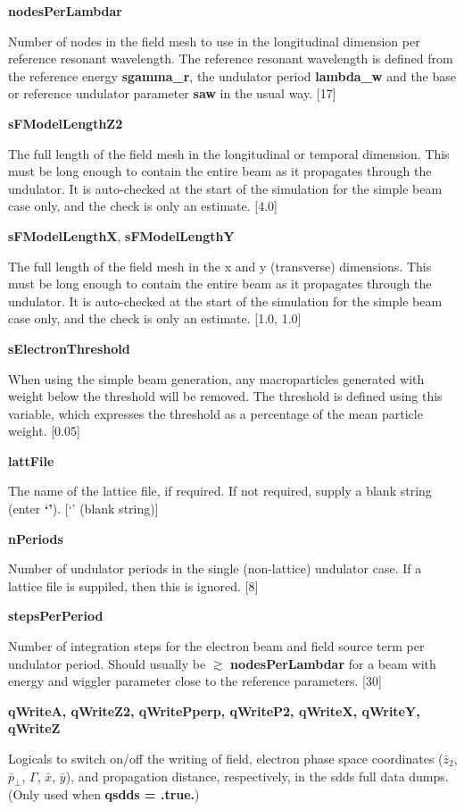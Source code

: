 \documentclass[12pt]{article}%
\begin{document}
{\bf nodesPerLambdar}

Number of nodes in the field mesh to use in the longitudinal dimension per reference resonant wavelength. The reference resonant wavelength is defined from the reference energy {\bf sgamma\_r}, the undulator period {\bf lambda\_w} and the base or reference undulator parameter {\bf saw} in the usual way. [17]

{\bf sFModelLengthZ2}

The full length of the field mesh in the longitudinal or temporal dimension. This must be long enough to contain the entire beam as it propagates through the undulator. It is auto-checked at the start of the simulation for the simple beam case only, and the check is only an estimate. [4.0]

{\bf sFModelLengthX}, {\bf sFModelLengthY}

The full length of the field mesh in the x and y (transverse) dimensions. This must be long enough to contain the entire beam as it propagates through the undulator. It is auto-checked at the start of the simulation for the simple beam case only, and the check is only an estimate. [1.0, 1.0]

{\bf sElectronThreshold}

When using the simple beam generation, any macroparticles generated with weight below the threshold will be removed. The threshold is defined using this variable, which expresses the threshold as a percentage of the mean particle weight. [0.05]

{\bf lattFile}

The name of the lattice file, if required. If not required, supply a blank string (enter {\bf `'}). [`' (blank string)]

{\bf nPeriods}

Number of undulator periods in the single (non-lattice) undulator case. If a lattice file is suppiled, then this is ignored. [8]

{\bf stepsPerPeriod}

Number of integration steps for the electron beam and field source term per undulator period. Should usually be $\gtrsim$ {\bf nodesPerLambdar} for a beam with energy and wiggler parameter close to the reference parameters. [30]

{\bf qWriteA, qWriteZ2, qWritePperp, qWriteP2, qWriteX, qWriteY, qWriteZ}

Logicals to switch on/off the writing of field, electron phase space coordinates ($\bar{z}_2$, $\bar{p}_\bot$, $\Gamma$, $\bar{x}$, $\bar{y}$), and propagation distance, respectively, in the sdds full data dumps. (Only used when {\bf qsdds = .true.})
\end{document}
